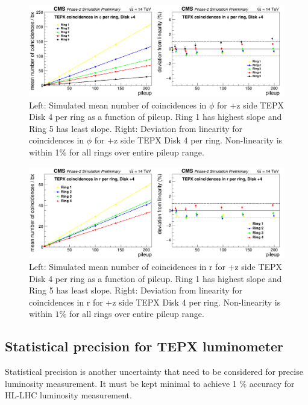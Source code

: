 \begin{figure}[H]
  \centering
  \includegraphics[width=1\columnwidth]{ashish_thesis/coincidencesinphiperringD+4.png}
  \caption{Left: Simulated mean number of coincidences in $\phi$ for +z side TEPX Disk 4 per ring as a function of pileup. Ring 1 has highest slope and Ring 5 has least slope. Right: Deviation from linearity for coincidences in $\phi$ for +z side TEPX Disk 4 per ring. Non-linearity is within 1\% for all rings over entire pileup range.}
  \label{fig:CMS}
\end{figure}





\begin{figure}[H]
  \centering
  \includegraphics[width=1\columnwidth]{ashish_thesis/coincidencesinrperringD+4.png}
  \caption{Left: Simulated mean number of coincidences in r for +z side TEPX Disk 4 per ring as a function of pileup. Ring 1 has highest slope and Ring 5 has least slope. Right: Deviation from linearity for coincidences in r for +z side TEPX Disk 4 per ring. Non-linearity is within $1\%$ for all rings over entire pileup range.}
  \label{fig:CMS}
\end{figure}


\subsection{Statistical precision for TEPX luminometer}
Statistical precision is another uncertainty that need to be considered for precise luminosity measurement. It must be kept minimal to achieve 1 $\%$ accuracy for HL-LHC luminosity measurement.

